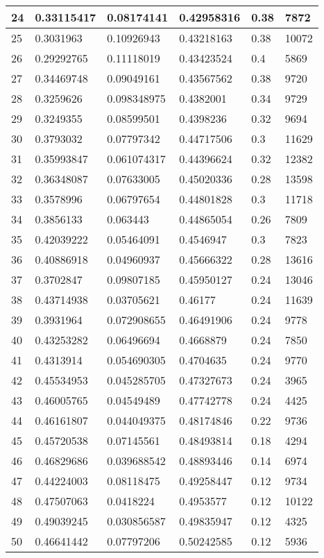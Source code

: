 \begin{longtable}{|l|l|l|l|l|l|}
24 & 0.33115417 & 0.08174141 & 0.42958316 & 0.38 & 7872 \\ \hline 
25 & 0.3031963 & 0.10926943 & 0.43218163 & 0.38 & 10072 \\ \hline 
26 & 0.29292765 & 0.11118019 & 0.43423524 & 0.4 & 5869 \\ \hline 
27 & 0.34469748 & 0.09049161 & 0.43567562 & 0.38 & 9720 \\ \hline 
28 & 0.3259626 & 0.098348975 & 0.4382001 & 0.34 & 9729 \\ \hline 
29 & 0.3249355 & 0.08599501 & 0.4398236 & 0.32 & 9694 \\ \hline 
30 & 0.3793032 & 0.07797342 & 0.44717506 & 0.3 & 11629 \\ \hline 
31 & 0.35993847 & 0.061074317 & 0.44396624 & 0.32 & 12382 \\ \hline 
32 & 0.36348087 & 0.07633005 & 0.45020336 & 0.28 & 13598 \\ \hline 
33 & 0.3578996 & 0.06797654 & 0.44801828 & 0.3 & 11718 \\ \hline 
34 & 0.3856133 & 0.063443 & 0.44865054 & 0.26 & 7809 \\ \hline 
35 & 0.42039222 & 0.05464091 & 0.4546947 & 0.3 & 7823 \\ \hline 
36 & 0.40886918 & 0.04960937 & 0.45666322 & 0.28 & 13616 \\ \hline 
37 & 0.3702847 & 0.09807185 & 0.45950127 & 0.24 & 13046 \\ \hline 
38 & 0.43714938 & 0.03705621 & 0.46177 & 0.24 & 11639 \\ \hline 
39 & 0.3931964 & 0.072908655 & 0.46491906 & 0.24 & 9778 \\ \hline 
40 & 0.43253282 & 0.06496694 & 0.4668879 & 0.24 & 7850 \\ \hline 
41 & 0.4313914 & 0.054690305 & 0.4704635 & 0.24 & 9770 \\ \hline 
42 & 0.45534953 & 0.045285705 & 0.47327673 & 0.24 & 3965 \\ \hline 
43 & 0.46005765 & 0.04549489 & 0.47742778 & 0.24 & 4425 \\ \hline 
44 & 0.46161807 & 0.044049375 & 0.48174846 & 0.22 & 9736 \\ \hline 
45 & 0.45720538 & 0.07145561 & 0.48493814 & 0.18 & 4294 \\ \hline 
46 & 0.46829686 & 0.039688542 & 0.48893446 & 0.14 & 6974 \\ \hline 
47 & 0.44224003 & 0.08118475 & 0.49258447 & 0.12 & 9734 \\ \hline 
48 & 0.47507063 & 0.0418224 & 0.4953577 & 0.12 & 10122 \\ \hline 
49 & 0.49039245 & 0.030856587 & 0.49835947 & 0.12 & 4325 \\ \hline 
50 & 0.46641442 & 0.07797206 & 0.50242585 & 0.12 & 5936 \\ \hline 
\end{longtable}